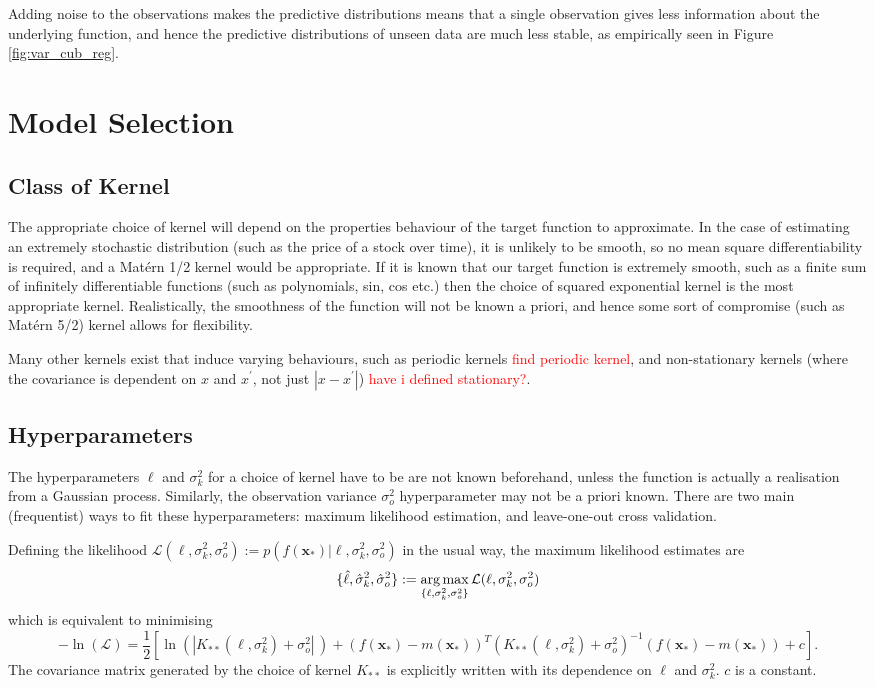 Adding noise to the observations makes the predictive distributions means
that a single observation gives less information about the underlying function,
and hence the predictive distributions of unseen data are
much less stable, as empirically seen in Figure \ref{fig:var_cub_reg}.

\section{Model Selection}

\subsection*{Class of Kernel}

The appropriate choice of kernel will depend on the properties behaviour of the
target function to approximate. In the case of estimating an extremely
stochastic distribution (such as the price of a stock over time), it is
unlikely to be smooth, so no mean square differentiability is required, and a
Mat\'ern 1/2 kernel would be appropriate. If it is known that our target
function is extremely smooth, such as a finite sum of infinitely differentiable
functions (such as polynomials, sin, cos etc.) then the choice of squared
exponential kernel is the most appropriate kernel. Realistically, the
smoothness of the function will not be known a priori, and hence some sort of
compromise (such as Mat\'ern 5/2) kernel allows for flexibility.

Many other kernels exist that induce varying behaviours, such as periodic
kernels \textcolor{red}{find periodic kernel}, and non-stationary kernels
(where the covariance is dependent on $x$ and $x^\prime$, not just
$|x - x^\prime|$)
\textcolor{red}{have i defined stationary?}.

\subsection*{Hyperparameters}

The hyperparameters $\ell$ and $\sigma^2_k$ for a choice of kernel have to be
are not known beforehand, unless the function is actually a realisation from
a Gaussian process. Similarly, the observation variance $\sigma^2_o$
hyperparameter may not be a priori
known. There are two main (frequentist) ways to fit these hyperparameters:
maximum likelihood estimation, and leave-one-out cross validation.

Defining the likelihood
$
    \mathcal{L}(\ell, \sigma^2_k, \sigma^2_o)
    := p(f(\mathbf{x}_*) | \ell, \sigma^2_k, \sigma^2_o)
$ in the usual way,
the maximum likelihood estimates are
$$
    \{\hat{\ell}, \hat{\sigma}^2_k, \hat{\sigma}^2_o\} :=
    \operatorname*{arg\,max}_{\{\ell, \sigma^2_k, \sigma^2_o\}}
    \mathcal{L}(\ell, \sigma^2_k, \sigma^2_o)
$$
which is equivalent to minimising
$$
    -\ln(\mathcal{L}) =\frac{1}{2} \left[
    \ln (|K_{**}(\ell, \sigma^2_k) + \sigma^2_o|\,)
    + (f(\mathbf{x}_*) - m(\mathbf{x}_*))^T
    (K_{**}(\ell, \sigma^2_k) + \sigma^2_o)^{-1}
    (f(\mathbf{x}_*) - m(\mathbf{x}_*)) + c
    \right].
$$
The covariance matrix generated by the choice of kernel $K_{**}$ is
explicitly written with its dependence on $\ell$ and $\sigma^2_k.$ $c$ is a
constant.

